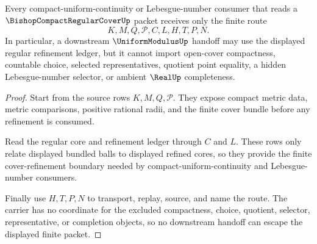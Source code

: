 \begin{theorem}
\label{thm:compact-regular-cover-nonescape}
Every compact-uniform-continuity or Lebesgue-number consumer that reads a $\BishopCompactRegularCoverUp$ packet receives only the finite route
$$
K,M,Q,\mathcal{P},C,L,H,T,P,N .
$$
In particular, a downstream $\UniformModulusUp$ handoff may use the displayed regular refinement ledger, but it cannot import open-cover compactness, countable choice, selected representatives, quotient point equality, a hidden Lebesgue-number selector, or ambient $\RealUp$ completeness.
\end{theorem}
\begin{proof}
Start from the source rows $K,M,Q,\mathcal{P}$. They expose compact metric data, metric comparisons, positive rational radii, and the finite cover bundle before any refinement is consumed.

Read the regular core and refinement ledger through $C$ and $L$. These rows only relate displayed bundled balls to displayed refined cores, so they provide the finite cover-refinement boundary needed by compact-uniform-continuity and Lebesgue-number consumers.

Finally use $H,T,P,N$ to transport, replay, source, and name the route. The carrier has no coordinate for the excluded compactness, choice, quotient, selector, representative, or completion objects, so no downstream handoff can escape the displayed finite packet.
\end{proof}


\begin{closurestatus}{\BishopCompactRegularCoverUp}
  \theoryclosure{\seedClosure}
  \formalstatus{\unformalizedV}
\end{closurestatus}
